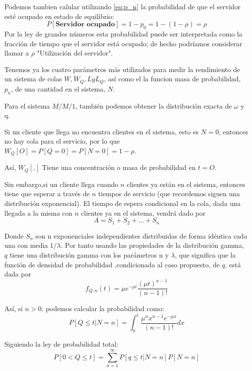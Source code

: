 \documentclass[a4paper,10pt]{scrartcl}
\theoremstyle{definition}
\numberwithin{equation}{section}
\begin{document}
	Podemos tambien calular utilizando \ref{eq:p_n} la probabilidad de que el servidor esté ocupado en estado de equilibrio:
	\begin{equation*}
	P[\textbf{Servidor ocupado}]=1-p_0=1-(1-\rho)=\rho
	\end{equation*}
	Por la ley de grandes números esta probabilidad puede ser interpretada como la fracción de tiempo que el 
	servidor está ocupado; de hecho podríamos considerar llamar a $\rho$ "Utilización del servidor".
	
	Tenemos ya los cuatro parámetros más utilizados para medir la rendimiento de un sistema de colas 
	$W, W_Q, L y L_Q$, así como el la funcion masa de probabilidad, $p_n$, de una cantidad en el sistema, $N$. 
	
	Para el sistema $M/M/1$, también podemos obtener la distribución exacta de $\omega$ y q.
	
	Si un cliente que llega no encuentra clientes en el sistema, esto es $N=0$, entonces no hay cola para el 
	servicio, por lo que $W_Q [O] = P [Q = 0] = P [N = 0] = 1 - \rho$.
	
	Así, $W_Q [.]$ Tiene una concentración o masa de probabilidad en $t = O$.
	
	Sin embargo,si un cliente llega cuando $n$ clientes ya están en el sistema, entonces tiene que esperar a
	través de $n$ tiempos de servicio (que recordemos siguen una distribución exponencial). El tiempo
	de espera condicional en la cola, dada una llegada a la misma con $n$ clientes ya en el sistema, vendrá dado por
	\[A = S_1 + S_2 + \dots + S_n\]
	
	Donde $S_n$ son n exponenciales independientes distribuidas de forma idéntica cada una con media $1 / \lambda$.  Por tanto usando las propiedades de la distribución gamma, $q$ tiene una distribución gamma con los parámetros n y $\lambda$, que significa que la función de densidad de probabilidad ,condicionada al caso propuesto, de $q$, está dada por
	\begin{equation*}
	f_{Q,n}(t)=\mu e^{-\mu t} \frac{(\mu t)^{n-1}}{(n-1)!}
	\end{equation*}
	
	Así, si $n > 0$, podemos calcular la probabilidad como:
	\begin{equation*}
	P[Q \le t|N=n]=\int_{0}^{t}\frac{\mu^n x^{n-1} e^{-\mu x}}{(n-1)!}dx
	\end{equation*}
	
	Siguiendo la ley de probabilidad total:
	\begin{equation*}
	P[0 < Q \le t]=\sum_{n=1}^{\infty}P[q\le t|N=n]P[N=n]
	\end{equation*}
	
\end{document}
